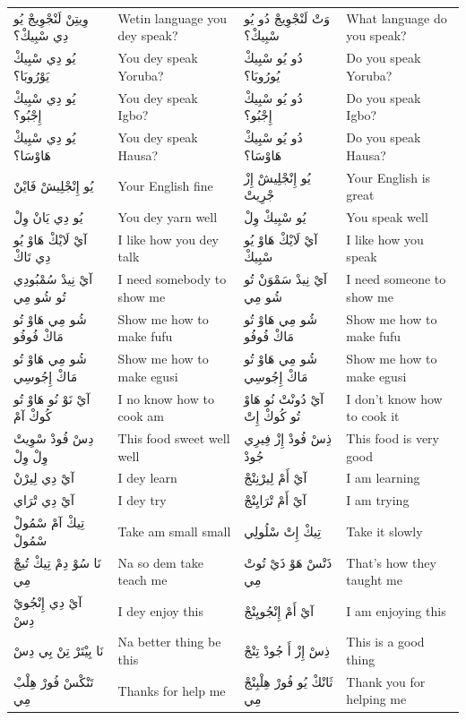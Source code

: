 \documentclass[12pt]{article}
\begin{document}
\begin{longtable}{p{3.2cm} p{3.2cm} p{3.2cm} p{3.2cm}}
وِيتِنْ لَنْجْوِيجْ يُو دِي سْبِيكْ؟ & Wetin language you dey speak? & وَتْ لَنْجْوِيجْ دُو يُو سْبِيكْ؟ & What language do you speak? \\
يُو دِي سْبِيكْ يَوْرُوبَا؟ & You dey speak Yoruba? & دُو يُو سْبِيكْ يُورُوبَا؟ & Do you speak Yoruba? \\
يُو دِي سْبِيكْ إِجْبُو؟ & You dey speak Igbo? & دُو يُو سْبِيكْ إِجْبُو؟ & Do you speak Igbo? \\
يُو دِي سْبِيكْ هَاوْسَا؟ & You dey speak Hausa? & دُو يُو سْبِيكْ هَاوْسَا؟ & Do you speak Hausa? \\
يُو إِنْجْلِيشْ فَايْنْ & Your English fine & يُو إِنْجْلِيشْ إِزْ جْرِيتْ & Your English is great \\
يُو دِي يَانْ وِلْ & You dey yarn well & يُو سْبِيكْ وِلْ & You speak well \\
آيْ لَايْكْ هَاوْ يُو دِي تَاكْ & I like how you dey talk & آيْ لَايْكْ هَاوْ يُو سْبِيكْ & I like how you speak \\
آيْ نِيدْ سُمْبُودِي تُو شُو مِي & I need somebody to show me & آيْ نِيدْ سَمْوَنْ تُو شُو مِي & I need someone to show me \\
شُو مِي هَاوْ تُو مَاكْ فُوفُو & Show me how to make fufu & شُو مِي هَاوْ تُو مَاكْ فُوفُو & Show me how to make fufu \\
شُو مِي هَاوْ تُو مَاكْ إِجُوسِي & Show me how to make egusi & شُو مِي هَاوْ تُو مَاكْ إِجُوسِي & Show me how to make egusi \\
آيْ نَوْ نُو هَاوْ تُو كُوكْ آمْ & I no know how to cook am & آيْ دُونْتْ نُو هَاوْ تُو كُوكْ إِتْ & I don’t know how to cook it \\
دِسْ فُودْ سْوِيتْ وِلْ وِلْ & This food sweet well well & ذِسْ فُودْ إِزْ فِيرِي جُودْ & This food is very good \\
آيْ دِي لِيرْنْ & I dey learn & آيْ أَمْ لِيرْنِنْجْ & I am learning \\
آيْ دِي تْرَاي & I dey try & آيْ أَمْ تْرَايِنْجْ & I am trying \\
تِيكْ آمْ سْمُولْ سْمُولْ & Take am small small & تِيكْ إِتْ سْلُولِي & Take it slowly \\
نَا سُوْ دِمْ تِيكْ تُيچْ مِي & Na so dem take teach me & ذَتْسْ هَوْ ذَيْ تُوتْ مِي & That’s how they taught me \\
آيْ دِي إِنْجُويْ دِسْ & I dey enjoy this & آيْ أَمْ إِنْجُويِنْجْ & I am enjoying this \\
نَا بِيْتَرْ تِنْ بِي دِسْ & Na better thing be this & ذِسْ إِزْ أَ جُودْ تِنْجْ & This is a good thing \\
تَنْكْسْ فُورْ هِلْبْ مِي & Thanks for help me & ثَانْكْ يُو فُورْ هِلْبِنْجْ مِي & Thank you for helping me \\

\end{longtable}
\end{document}
